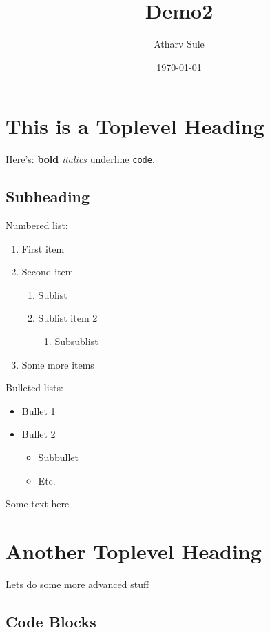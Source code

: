 \documentclass[11pt]{article}
\author{Atharv Sule}
\date{\today}
\title{Demo2}
\begin{document}
\maketitle

\section{This is a  Toplevel Heading}
\label{sec:org2feb7b4}

Here's: \textbf{bold} \emph{italics} \uline{underline} \texttt{code}.

\subsection{Subheading}
\label{sec:org1b3f0cf}

Numbered list:

\begin{enumerate}
\item First item
\item Second item
\begin{enumerate}
\item Sublist
\item Sublist item 2
\begin{enumerate}
\item Subsublist
\end{enumerate}
\end{enumerate}
\item Some more items
\end{enumerate}

Bulleted lists:
\begin{itemize}
\item Bullet 1
\item Bullet 2
\begin{itemize}
\item Subbullet
\item Etc.
\end{itemize}
\end{itemize}

Some text here

\newpage

\section{Another Toplevel Heading}
\label{sec:orgbb2ab5b}
Lets do some more advanced stuff

\subsection{Code Blocks}
\label{sec:org4c58c7a}
\end{document}
